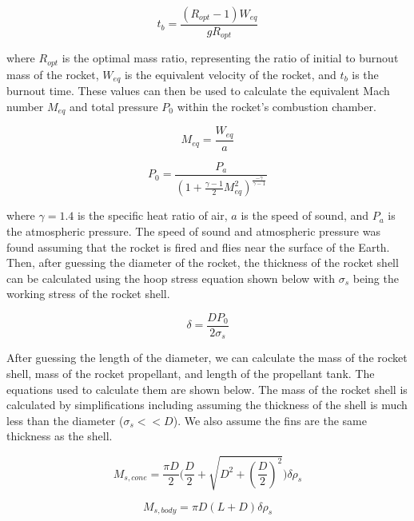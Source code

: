 \documentclass{report}
\begin{document}
\begin{equation}
    t_b = \frac{(R_{opt}-1)W_{eq}}{gR_{opt}}
\end{equation}

\noindent where $R_{opt}$ is the optimal mass ratio, representing the ratio of initial to burnout mass of the rocket, $W_{eq}$ is the equivalent velocity of the rocket, and $t_b$ is the burnout time.
These values can then be used to calculate the equivalent Mach number $M_{eq}$ and total pressure $P_0$ within the rocket's combustion chamber.

\begin{equation}
    M_{eq} = \frac{W_{eq}}{a}
\end{equation}

\begin{equation}
    P_0 = \frac{P_a}{(1+\frac{\gamma-1}{2}M^2_{eq})^{\frac{-\gamma}{\gamma-1}}}
\end{equation}

\noindent where $\gamma = 1.4$ is the specific heat ratio of air, $a$ is the speed of sound, and $P_a$ is the atmospheric pressure.
The speed of sound and atmospheric pressure was found assuming that the rocket is fired and flies near the surface of the Earth. \\

\noindent Then, after guessing the diameter of the rocket, the thickness of the rocket shell can be calculated using the hoop stress equation shown below with $\sigma_s$ being the working stress of the rocket shell.

\begin{equation}
    \delta = \frac{DP_0}{2\sigma_s}
\end{equation}

\noindent After guessing the length of the diameter, we can calculate the mass of the rocket shell, mass of the rocket propellant, and length of the propellant tank.
The equations used to calculate them are shown below.
The mass of the rocket shell is calculated by simplifications including assuming the thickness of the shell is much less than the diameter ($\sigma_s << D$).
We also assume the fins are the same thickness as the shell.

\begin{equation}
    M_{s,cone} = \frac{\pi D}{2}\Biggl(\frac{D}{2}+\sqrt{D^2+(\frac{D}{2})^2}\Biggr)\delta\rho_s
\end{equation}

\begin{equation}
    M_{s,body} = \pi D(L+D)\delta\rho_s
\end{equation}
\end{document}
